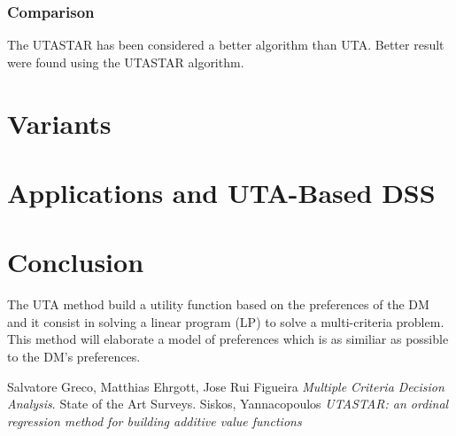 \documentclass{report}
\begin{document}
\subsection{Comparison}
The UTASTAR has been considered a better algorithm than UTA. Better result were found using the UTASTAR algorithm.
\chapter{Variants}

\chapter{Applications and UTA-Based DSS}

\chapter{Conclusion}
The UTA method build a utility function based on the preferences of the DM and it consist in solving a linear program (LP) to solve a multi-criteria problem.\\

This method will elaborate a model of preferences which is as similiar as possible to the DM's preferences.

\begin{thebibliography}{9}
Salvatore Greco, Matthias Ehrgott, Jose Rui Figueira \textit{Multiple Criteria Decision Analysis}. 
State of the Art Surveys.
Siskos, Yannacopoulos \textit{UTASTAR: an ordinal regression method for building additive value functions}
\end{thebibliography}
\end{document}
